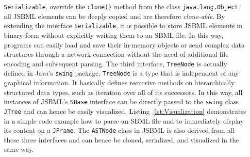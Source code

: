 \texttt{Serializable}, %
%
override the \texttt{clone()} method from the class \texttt{java.lang.Object},
%
all JSBML elements can be deeply copied and are therefore \emph{clone-able}. By
extending the interface \texttt{Serializable},
%
it is possible to store JSBML
%
elements in binary form without explicitly writing them to an SBML file.
%
In this way, programs can easily load and save their in-memory objects or send
complex data structures through a network connection without the need of
additional file encoding and subsequent parsing. The third interface,
\texttt{TreeNode}%
is actually defined in Java's \texttt{swing}
%
package.
\texttt{TreeNode} is a type that is independent of any graphical information. It
basically defines recursive methods on hierarchically structured data types,
such as iteration over all of its successors. In this way, all instances of
JSBML's \texttt{SBase}%
interface can be directly passed to the \texttt{swing}
%
class \texttt{JTree}
%
and can hence be easily visualized. Listing~\vref{lst:Visualization}
demonstrates in a simple code example how to parse an SBML file
%
and to immediately display its content on a \texttt{JFrame}.
%
%
The \texttt{ASTNode} class in JSBML is also
derived from all these three interfaces and can hence be cloned, serialized, and
visualized in the same way.

